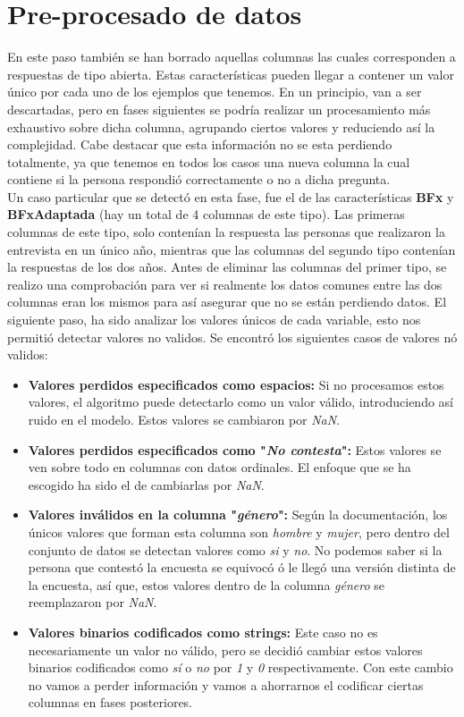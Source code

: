 \section{Pre-procesado de datos}
En este paso también se han borrado aquellas columnas las cuales corresponden a respuestas de tipo abierta. Estas características pueden llegar a contener un valor único por cada uno de los ejemplos que tenemos. En un principio, van a ser descartadas, pero en fases siguientes se podría realizar un procesamiento más exhaustivo sobre dicha columna, agrupando ciertos valores y reduciendo así la complejidad. Cabe destacar que esta información no se esta perdiendo totalmente, ya que tenemos en todos los casos una nueva columna la cual contiene si la persona respondió correctamente o no a dicha pregunta. \\
\linebreak
Un caso particular que se detectó en esta fase, fue el de las características \textbf{BFx} y \textbf{BFxAdaptada} (hay un total de 4 columnas de este tipo). Las primeras columnas de este tipo, solo contenían la respuesta las personas que realizaron la entrevista en un único año, mientras que las columnas del segundo tipo contenían la respuestas de los dos años. Antes de eliminar las columnas del primer tipo, se realizo una comprobación para ver si realmente los datos comunes entre las dos columnas eran los mismos para así asegurar que no se están perdiendo datos.
\linebreak
El siguiente paso, ha sido analizar los valores únicos de cada variable, esto nos permitió detectar valores no validos. Se encontró los siguientes casos de valores nó validos:
\begin{itemize}
	\item \textbf{Valores perdidos especificados como espacios:} Si no procesamos estos valores, el algoritmo puede detectarlo como un valor válido, introduciendo así ruido en el modelo. Estos valores se cambiaron por \textit{NaN}.
	\item \textbf{Valores perdidos especificados como "\textit{No contesta}":} Estos valores se ven sobre todo en columnas con datos ordinales. El enfoque que se ha escogido ha sido el de cambiarlas por \textit{NaN}.
	\item \textbf{Valores inválidos en la columna "\textit{género}":} Según la documentación, los únicos valores que forman esta columna son \textit{hombre} y \textit{mujer}, pero dentro del conjunto de datos se detectan valores como \textit{si} y \textit{no}. No podemos saber si la persona que contestó la encuesta se equivocó ó le llegó una versión distinta de la encuesta, así que, estos valores dentro de la columna \textit{género} se reemplazaron por \textit{NaN}.
	\item \textbf{Valores binarios codificados como strings:} Este caso no es necesariamente un valor no válido, pero se decidió cambiar estos valores binarios codificados como \textit{sí} o \textit{no} por \textit{1} y \textit{0} respectivamente. Con este cambio no vamos a perder información y vamos a ahorrarnos el codificar ciertas columnas en fases posteriores.
\end{itemize}

